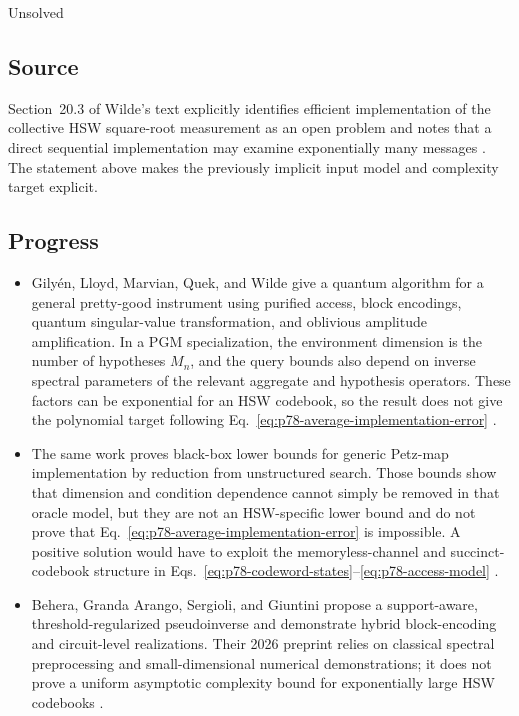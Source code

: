 Unsolved

\subsection*{Source}

Section~20.3 of Wilde's text explicitly identifies efficient implementation
of the collective HSW square-root measurement as an open problem and notes
that a direct sequential implementation may examine exponentially many
messages .  The statement above makes the
previously implicit input model and complexity target explicit.

\subsection*{Progress}

\begin{itemize}
  \item Gily\'en, Lloyd, Marvian, Quek, and Wilde give a quantum algorithm for
  a general pretty-good instrument using purified access, block encodings,
  quantum singular-value transformation, and oblivious amplitude
  amplification.  In a PGM specialization, the environment dimension is the
  number of hypotheses $M_n$, and the query bounds also depend on inverse
  spectral parameters of the relevant aggregate and hypothesis operators.
  These factors can be exponential for an HSW codebook, so the result does
  not give the polynomial target following
  Eq.~\eqref{eq:p78-average-implementation-error}
  .

  \item The same work proves black-box lower bounds for generic Petz-map
  implementation by reduction from unstructured search.  Those bounds show
  that dimension and condition dependence cannot simply be removed in that
  oracle model, but they are not an HSW-specific lower bound and do not prove
  that Eq.~\eqref{eq:p78-average-implementation-error} is impossible.  A
  positive solution would have to exploit the memoryless-channel and
  succinct-codebook structure in
  Eqs.~\eqref{eq:p78-codeword-states}--\eqref{eq:p78-access-model}
  .

  \item Behera, Granda Arango, Sergioli, and Giuntini propose a
  support-aware, threshold-regularized pseudoinverse and demonstrate hybrid
  block-encoding and circuit-level realizations.  Their 2026 preprint relies
  on classical spectral preprocessing and small-dimensional numerical
  demonstrations; it does not prove a uniform asymptotic complexity bound for
  exponentially large HSW codebooks
  .
\end{itemize}

